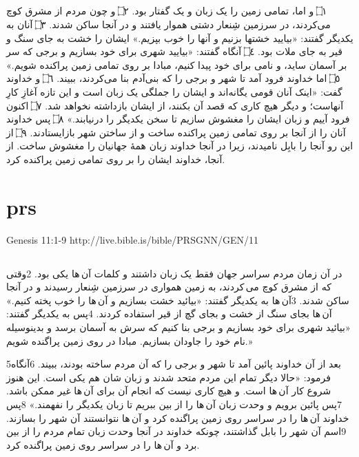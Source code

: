 \documentclass[12pt,fleqn,titlepage,twoside,a4paper]{book}
\begin{document}
\begin{arab}[utf]
\section*{}

۝١  و اما، تمامی زمین را یک زبان و یک گفتار بود. ۝٢ و چون مردم از مشرق کوچ می‌کردند، در سرزمین شِنعار دشتی هموار یافتند و در آنجا ساکن شدند. ۝٣ آنان به یکدیگر گفتند: «بیایید خشتها بزنیم و آنها را خوب بپزیم.» ایشان را خشت به جای سنگ و قیر به جای ملات بود. ۝٤ آنگاه گفتند: «بیایید شهری برای خود بسازیم و برجی که سر بر آسمان ساید، و نامی برای خود پیدا کنیم، مبادا بر روی تمامی زمین پراکنده شویم.» ۝٥ اما خداوند فرود آمد تا شهر و برجی را که بنی‌آدم بنا می‌کردند، ببیند. ۝٦ و خداوند گفت: «اینک آنان قومی یگانه‌اند و ایشان را جملگی یک زبان است و این تازه آغازِ کارِ آنهاست؛ و دیگر هیچ کاری که قصد آن بکنند، از ایشان بازداشته نخواهد شد. ۝٧ اکنون فرود آییم و زبان ایشان را مغشوش سازیم تا سخن یکدیگر را درنیابند.» ۝٨ پس خداوند آنان را از آنجا بر روی تمامی زمین پراکنده ساخت و از ساختن شهر بازایستادند. ۝٩ از این رو آنجا را بابِل نامیدند، زیرا در آنجا خداوند زبان همۀ جهانیان را مغشوش ساخت. از آنجا، خداوند ایشان را بر روی تمامی زمین پراکنده کرد.

\end{arab}


\section{prs}

Genesis 11:1-9 http://live.bible.is/bible/PRSGNN/GEN/11

\begin{arab}[utf]
\section*{}

در آن زمان مردم سراسر جهان فقط یک زبان داشتند و کلمات آن ها یکی بود. 2وقتی که از مشرق کوچ می کردند، به زمین همواری در سرزمین شِنعار رسیدند و در آنجا ساکن شدند. 3آن ها به یکدیگر گفتند: «بیائید خشت بسازیم و آن ها را خوب پخته کنیم.» آن ها بجای سنگ از خشت و بجای گچ از قیر استفاده کردند. 4پس به یکدیگر گفتند: «بیائید شهری برای خود بسازیم و برجی بنا کنیم که سرش به آسمان برسد و بدینوسیله نام خود را جاودان بسازیم. مبادا در روی زمین پراگنده شویم.»

5بعد از آن خداوند پائین آمد تا شهر و برجی را که آن مردم ساخته بودند، ببیند. 6آنگاه فرمود: «حالا دیگر تمام این مردم متحد شدند و زبان شان هم یکی است. این هنوز شروع کار آن ها است. و هیچ کاری نیست که انجام آن برای آن ها غیر ممکن باشد. 7پس پائین برویم و وحدت زبان آن ها را از بین ببریم تا زبان یکدیگر را نفهمند.» 8پس خداوند آن ها را در سراسر روی زمین پراگنده کرد و آن ها نتوانستند آن شهر را بسازند. 9اسم آن شهر را بابل گذاشتند، چونکه خداوند در آنجا وحدت زبان تمام مردم را از بین برد و آن ها را در سراسر روی زمین پراگنده کرد.

\end{arab}
\end{document}
